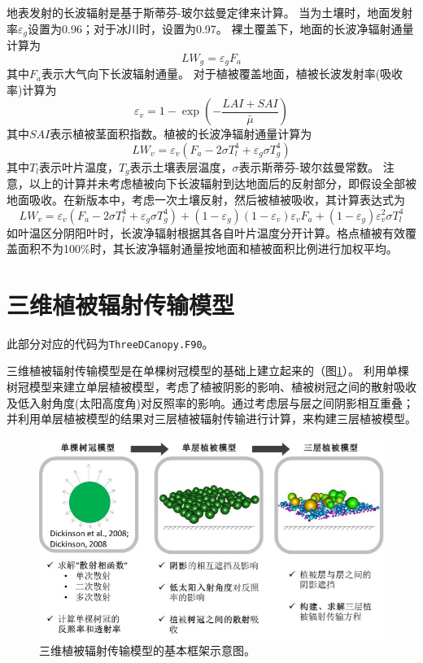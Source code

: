 地表发射的长波辐射是基于斯蒂芬-玻尔兹曼定律来计算。
当为土壤时，地面发射率$\varepsilon_g$设置为0.96；对于冰川时，设置为0.97。
裸土覆盖下，地面的长波净辐射通量计算为
\begin{equation}
L W_{g}=\varepsilon_{g} F_{a}
\end{equation}
其中$F_a$表示大气向下长波辐射通量。
对于植被覆盖地面，植被长波发射率(吸收率)计算为
\begin{equation}
\varepsilon_{v}=1-\exp \left(-\frac{LAI+SAI}{\bar{\mu}}\right)
\end{equation}
其中$SAI$表示植被茎面积指数。植被的长波净辐射通量计算为
\begin{equation}
L W_{v}=\varepsilon_{v}\left(F_{a}-2 \sigma T_{l}^{4}+\varepsilon_{g} \sigma T_{g}^{4}\right)
\end{equation}
其中$T_l$表示叶片温度，$T_g$表示土壤表层温度，$\sigma$表示斯蒂芬-玻尔兹曼常数。
注意，以上的计算并未考虑植被向下长波辐射到达地面后的反射部分，即假设全部被地面吸收。在新版本中，考虑一次土壤反射，然后被植被吸收，其计算表达式为
\begin{equation}
L W_{v}=\varepsilon_{v}\left(F_{a}-2 \sigma T_{l}^{4}+\varepsilon_{g} \sigma T_{g}^{4}\right)+\left(1-\varepsilon_{g}\right)\left(1-\varepsilon_{v}\right) \varepsilon_{v} F_{a}+\left(1-\varepsilon_{g}\right) \varepsilon_{v}^{2} \sigma T_{l}^{4}
\end{equation}
如叶温区分阴阳叶时，长波净辐射根据其各自叶片温度分开计算。格点植被有效覆盖面积不为100\%时，其长波净辐射通量按地面和植被面积比例进行加权平均。

\section{三维植被辐射传输模型}\label{三维植被辐射传输模型}
此部分对应的代码为\texttt{ThreeDCanopy.F90}。

三维植被辐射传输模型\citep{yuan20143d}是在单棵树冠模型\citep{dickinson2008determination,dickinson2008three}的基础上建立起来的（图\ref{fig:三维植被辐射传输模型的基本框架}）。
利用单棵树冠模型来建立单层植被模型，考虑了植被阴影的影响、植被树冠之间的散射吸收及低入射角度(太阳高度角)对反照率的影响。通过考虑层与层之间阴影相互重叠；
并利用单层植被模型的结果对三层植被辐射传输进行计算，来构建三层植被模型。
{
\begin{figure}[]
\centering
\includegraphics{Figures/辐射过程及辐射通量计算/三维植被辐射传输模型的基本框架.png}
\caption{三维植被辐射传输模型的基本框架示意图。}
\label{fig:三维植被辐射传输模型的基本框架}
\end{figure}
}


